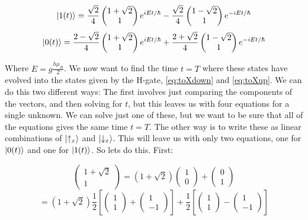 \documentclass[a4paper,norsk, 10pt]{article}
\begin{document}
\begin{equation}
\ket{1(t)} = \frac{\sqrt{2}}{4}
\begin{pmatrix}
1 + \sqrt{2} \\ 1
\end{pmatrix}
e^{iEt/\hbar}
-\frac{\sqrt{2}}{4}
\begin{pmatrix}
1 - \sqrt{2} \\ 1
\end{pmatrix}
e^{-iEt/\hbar}
\end{equation}\label{eq:upTime}
\begin{equation}
\ket{0(t)} = \frac{2-\sqrt{2}}{4}
\begin{pmatrix}
1 + \sqrt{2} \\ 1
\end{pmatrix}
e^{iEt/\hbar}
+\frac{2+\sqrt{2}}{4}
\begin{pmatrix}
1 - \sqrt{2} \\ 1
\end{pmatrix}
e^{-iEt/\hbar}
\end{equation}\label{eq:downTime}

Where $E = g\frac{h\mu_B}{2}$. We now want to find the time $t = T$ where these states have evolved into the states given by the H-gate, \eqref{eq:toXdown} and \eqref{eq:toXup}. We can do this two different ways: The first involves just comparing the components of the vectors, and then solving for $t$, but this leaves us with four equations for a single unknown. We can solve just one of these, but we want to be sure that all of the equations gives the same time $t = T$. The other way is to write these as linear combinations of $\ket{\uparrow _x}$ and $\ket{\downarrow _x}$. This will leave us with only two equations, one for $\ket{0(t)}$ and one for $\ket{1(t)}$. So lets do this. First:

\begin{equation}
\begin{pmatrix}
1 + \sqrt{2} \\ 1
\end{pmatrix}
= (1+\sqrt{2})
\begin{pmatrix}
1\\0
\end{pmatrix}
+
\begin{pmatrix}
0\\1
\end{pmatrix}
\end{equation}
\begin{equation}
=(1+\sqrt{2})
\frac{1}{2}\left[
\begin{pmatrix}
1\\1
\end{pmatrix}
+\begin{pmatrix}
1\\-1
\end{pmatrix}
\right]
+
\frac{1}{2}
\left[
\begin{pmatrix}
1\\1
\end{pmatrix}
-\begin{pmatrix}
1\\-1
\end{pmatrix}
\right]
\end{equation}
\end{document}
